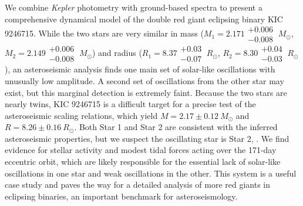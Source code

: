 We combine \emph{Kepler} photometry with ground-based spectra to present a comprehensive dynamical model of the double red giant eclipsing binary KIC 9246715. While the two stars are very similar in mass ($M_1 = 2.171\substack{+0.006 \\ -0.008} \ M_{\odot}$, $M_2 = 2.149\substack{+0.006 \\ -0.008} \ M_{\odot}$) and radius ($R_1 = 8.37\substack{+0.03 \\ -0.07} \ R_{\odot}$, $R_2 = 8.30\substack{+0.04 \\ -0.03} \ R_{\odot}$), an asteroseismic analysis finds one main set of solar-like oscillations with unusually low amplitude. A second set of oscillations from the other star may exist, but this marginal detection is extremely faint. Because the two stars are nearly twins, KIC 9246715 is a difficult target for a precise test of the asteroseismic scaling relations, which yield $M = 2.17\pm0.12 \ M_{\odot}$ and $R = 8.26\pm0.16 \ R_{\odot}$. Both Star 1 and Star 2 are consistent with the inferred asteroseismic properties, but we suspect the oscillating star is Star 2, . We find evidence for stellar activity and modest tidal forces acting over the 171-day eccentric orbit, which are likely responsible for the essential lack of solar-like oscillations in one star and weak oscillations in the other.  This system is a useful case study and paves the way for a detailed analysis of more red giants in eclipsing binaries, an important benchmark for asteroseismology.
  
  
  
  
  